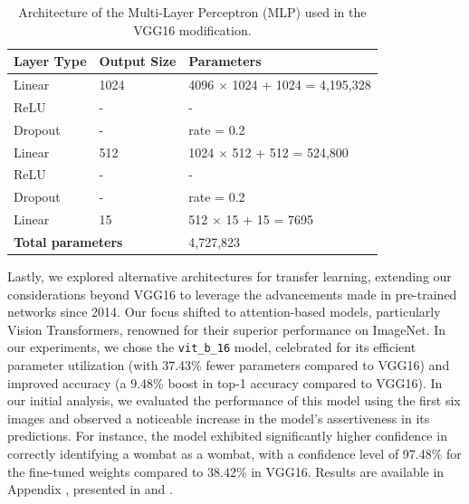 \begin{table}[H]
    \centering
    \begin{tabular}{@{}lll@{}}
        \toprule
        \textbf{Layer Type}                           & \textbf{Output Size} & \textbf{Parameters}                   \\ \midrule
        Linear                                        & 1024                 & 4096 $\times$ 1024 + 1024 = 4,195,328 \\
        ReLU                                          & -                    & -                                     \\
        Dropout                                       & -                    & rate = 0.2                            \\
        Linear                                        & 512                  & 1024 $\times$ 512 + 512 = 524,800     \\
        ReLU                                          & -                    & -                                     \\
        Dropout                                       & -                    & rate = 0.2                            \\
        Linear                                        & 15                   & 512 $\times$ 15 + 15 = 7695           \\
        \midrule
        \multicolumn{2}{l}{\textbf{Total parameters}} & 4,727,823                                                    \\
        \bottomrule
    \end{tabular}
    \caption{Architecture of the Multi-Layer Perceptron (MLP) used in the VGG16 modification.}
    \label{tab:mlp_architecture}
\end{table}

Lastly, we explored alternative architectures for transfer learning, extending our considerations beyond VGG16 to leverage the advancements made in pre-trained networks since 2014. Our focus shifted to attention-based models, particularly Vision Transformers, renowned for their superior performance on ImageNet. In our experiments, we chose the \texttt{vit\_b\_16} model, celebrated for its efficient parameter utilization (with 37.43\% fewer parameters compared to VGG16) and improved accuracy (a 9.48\% boost in top-1 accuracy compared to VGG16).  In our initial analysis, we evaluated the performance of this model using the first six images and observed a noticeable increase in the model's assertiveness in its predictions. For instance, the model exhibited significantly higher confidence in correctly identifying a wombat as a wombat, with a confidence level of 97.48\% for the fine-tuned weights compared to 38.42\% in VGG16. Results are available in Appendix , presented in  and .


